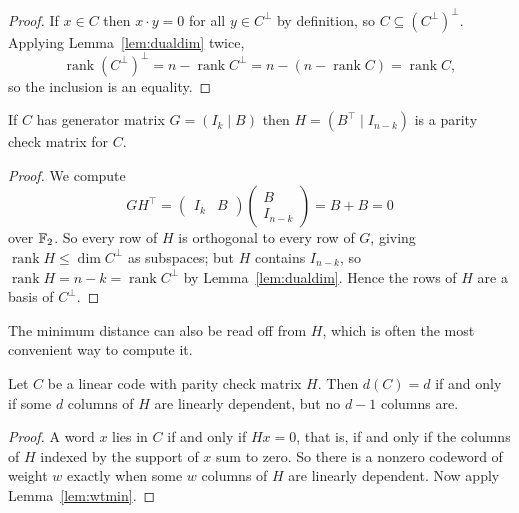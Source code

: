 \documentclass[a4paper]{scrartcl}
\DeclareMathOperator{\rank}{rank}
\begin{document}
\begin{proof}
	If $x \in C$ then $x\cdot y = 0$ for all $y \in C^\perp$ by definition, so $C \subseteq (C^\perp)^\perp$. Applying Lemma~\ref{lem:dualdim} twice,
	$$\rank (C^\perp)^\perp = n - \rank C^\perp = n - (n - \rank C) = \rank C,$$
	so the inclusion is an equality.
\end{proof}

\begin{lemma}\label{lem:HfromG}
	If $C$ has generator matrix $G = (I_k \mid B)$ then $H = (B^\top \mid I_{n-k})$ is a parity check matrix for $C$.
\end{lemma}

\begin{proof}
	We compute
	$$GH^\top = \begin{pmatrix} I_k & B\end{pmatrix}\begin{pmatrix} B \\ I_{n-k}\end{pmatrix} = B + B = 0$$
	over $\mathbb{F}_2$. So every row of $H$ is orthogonal to every row of $G$, giving $\rank H \le \dim C^\perp$ as subspaces; but $H$ contains $I_{n-k}$, so $\rank H = n-k = \rank C^\perp$ by Lemma~\ref{lem:dualdim}. Hence the rows of $H$ are a basis of $C^\perp$.
\end{proof}

The minimum distance can also be read off from $H$, which is often the most convenient way to compute it.

\begin{lemma}\label{lem:distH}
	Let $C$ be a linear code with parity check matrix $H$. Then $d(C) = d$ if and only if some $d$ columns of $H$ are linearly dependent, but no $d-1$ columns are.
\end{lemma}

\begin{proof}
	A word $x$ lies in $C$ if and only if $Hx = 0$, that is, if and only if the columns of $H$ indexed by the support of $x$ sum to zero. So there is a nonzero codeword of weight $w$ exactly when some $w$ columns of $H$ are linearly dependent. Now apply Lemma~\ref{lem:wtmin}.
\end{proof}
\end{document}
